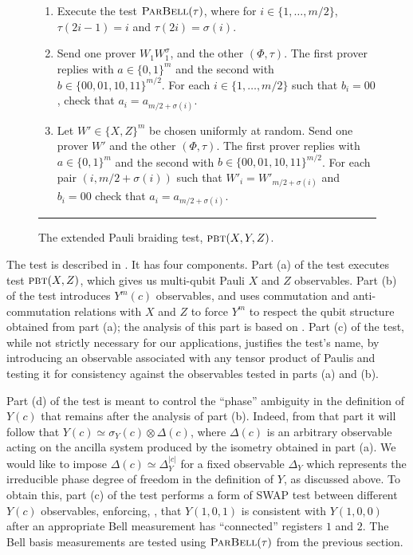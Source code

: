 \documentclass{toc}
\newcommand{\pbt}{\textsc{pbt}}
\newcommand{\pbellt}{\textsc{ParBell}}
\begin{document}
\begin{figure}[H]
\begin{itemize}
\begin{enumerate}
\begin{enumerate}
\item[(ii)] Execute the test $\pbellt(\tau)$, where for $i\in \{1,\ldots,m/2\}$, $\tau(2i-1)=i$ and $\tau(2i)=\sigma(i)$.
\item[(iii)] Send one prover $W_1  W_1^\sigma$, and the other $(\Phi,\tau)$. 
    The first prover replies with $a\in\{0, 1 \}^m$ and the second with $b\in \{00,01,10,11\}^{m/2}$. For each
    $i\in\{1,\ldots,m/2\}$ such that $b_i = 00$, check that $a_i  = a_{m/2+\sigma(i)}$. 
		\item[(iv)] Let $W'\in\{X,Z\}^m$ be chosen uniformly at random. Send one prover $W'$ and the other $(\Phi,\tau)$. The first prover replies  with $a\in\{0, 1 \}^m$ and the second with $b\in \{00,01,10,11\}^{m/2}$. For each pair $(i,m/2+\sigma(i))$ such that $W'_i=W'_{m/2+\sigma(i)}$ and $b_i=00$ check that $a_i=a_{m/2+\sigma(i)}$. 
\end{enumerate}
\end{enumerate}
\end{itemize}
\rule[2ex]{\textwidth}{0.5pt}\vspace{-.5cm}
\caption{The extended Pauli braiding test, $\pbt(X,Y,Z)$.}
\label{fig:e-pbt}
\end{figure} %

The test is described in . It has four components. Part (a) of the test executes test $\pbt(X,Z)$, which gives us multi-qubit Pauli $X$ and $Z$ observables. 
Part (b) of the test introduces $Y^m(c)$ observables, and uses commutation and anti-commutation relations with $X$ and $Z$ to force $Y^m$ to respect the qubit structure obtained from part (a); the analysis of this part is based on . Part (c) of the test, while not strictly necessary for our applications, justifies the test's name, by introducing an observable associated with any tensor product of Paulis and testing it for consistency against the observables tested in parts (a) and (b). 

Part (d) of the test is meant to control the ``phase'' ambiguity in the definition of $Y(c)$ that remains after the analysis of part (b). Indeed, from that part it will follow that $Y(c) \simeq \sigma_Y(c) \otimes \Delta(c)$, where $\Delta(c)$ is an arbitrary observable acting on the ancilla system produced by the isometry obtained in part (a). We would like to impose $\Delta(c) \simeq \Delta_Y^{|c|}$ for a fixed observable $\Delta_Y$ which  represents the irreducible phase degree of freedom in the definition of $Y$, as discussed above. To obtain this, part (c) of the test performs a form of SWAP test between different $Y(c)$ observables, %
enforcing, \eg, that  %
$Y(1,0,1)$ is consistent with $Y(1,0,0)$ after an appropriate Bell measurement has ``connected'' registers $1$ and $2$. The Bell basis measurements are tested using $\pbellt(\tau)$ from the previous section. 
\end{document}

